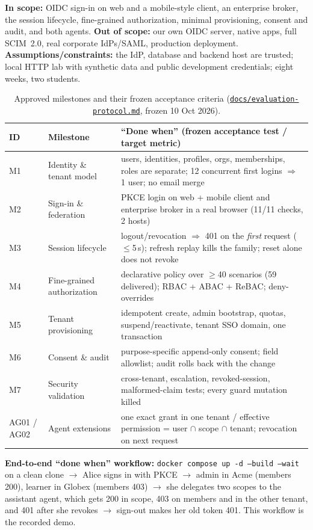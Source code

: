 \documentclass[11pt]{article}
\newcommand{\code}[1]{\texttt{\small #1}}
\newcommand{\repo}{https://github.com/krishnateja2314/iam-provider}
\newcommand{\gh}[2]{\href{\repo/blob/cs5903-final-2026/#1}{#2}}
\begin{document}
\textbf{In scope:} OIDC sign-in on web and a mobile-style client, an enterprise broker, the session lifecycle, fine-grained authorization, minimal provisioning, consent and audit, and both agents. \textbf{Out of scope:} our own OIDC server, native apps, full SCIM~2.0, real corporate IdPs/SAML, production deployment. \textbf{Assumptions/constraints:} the IdP, database and backend host are trusted; local HTTP lab with synthetic data and public development credentials; eight weeks, two students.

\begin{table}[H]
\centering\small
\begin{tabularx}{\textwidth}{@{}l P{3.3cm} L@{}}
\toprule
\textbf{ID} & \textbf{Milestone} & \textbf{``Done when'' (frozen acceptance test / target metric)}\\
\midrule
M1 & Identity \& tenant model & users, identities, profiles, orgs, memberships, roles are separate; 12 concurrent first logins $\Rightarrow$ 1 user; no email merge\\
M2 & Sign-in \& federation & PKCE login on web + mobile client and enterprise broker in a real browser (11/11 checks, 2 hosts)\\
M3 & Session lifecycle & logout/revocation $\Rightarrow$ 401 on the \emph{first} request ($\le$5\,s); refresh replay kills the family; reset alone does not revoke\\
M4 & Fine-grained authorization & declarative policy over $\ge$40 scenarios (59 delivered); RBAC + ABAC + ReBAC; deny-overrides\\
M5 & Tenant provisioning & idempotent create, admin bootstrap, quotas, suspend/reactivate, tenant SSO domain, one transaction\\
M6 & Consent \& audit & purpose-specific append-only consent; field allowlist; audit rolls back with the change\\
M7 & Security validation & cross-tenant, escalation, revoked-session, malformed-claim tests; every guard mutation killed\\
AG01 / AG02 & Agent extensions & one exact grant in one tenant / effective permission = user $\cap$ scope $\cap$ tenant; revocation on next request\\
\bottomrule
\end{tabularx}
\caption{Approved milestones and their frozen acceptance criteria (\gh{docs/evaluation-protocol.md}{\code{docs/evaluation-protocol.md}}, frozen 10 Oct 2026).}
\end{table}
\textbf{End-to-end ``done when'' workflow:} \code{docker compose up -d --build --wait} on a clean clone $\rightarrow$ Alice signs in with PKCE $\rightarrow$ admin in Acme (members 200), learner in Globex (members 403) $\rightarrow$ she delegates two scopes to the assistant agent, which gets 200 in scope, 403 on members and in the other tenant, and 401 after she revokes $\rightarrow$ sign-out makes her old token 401. This workflow is the recorded demo.
\end{document}

